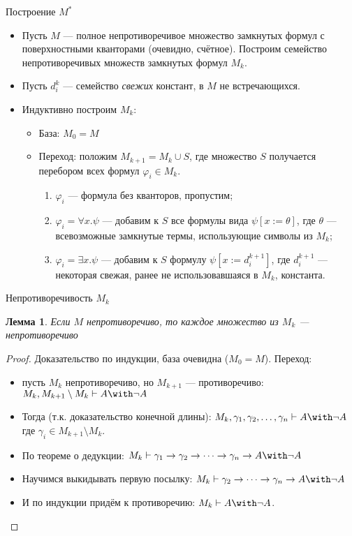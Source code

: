\documentclass[aspectratio=169]{beamer}
\newtheorem{lmm}{Лемма}[section]
\begin{document}
\begin{frame}{Построение $M^*$}
\begin{itemize}
\item Пусть $M$ --- полное непротиворечивое множество замкнутых формул с поверхностными кванторами (очевидно, счётное). \pause
 Построим семейство непротиворечивых множеств замкнутых формул $M_k$.\pause
\item Пусть $d^k_i$ --- семейство \emph{свежих} констант, в $M$ не встречающихся.\pause
\item Индуктивно построим $M_k$:
\begin{itemize}
\item База: $M_0 = M$\pause
\item Переход: положим $M_{k+1} = M_k \cup S$, где множество $S$ получается перебором всех формул $\varphi_i \in M_k$.\pause
\begin{enumerate}
\item $\varphi_i$ --- формула без кванторов, пропустим;\pause
\item $\varphi_i = \forall x.\psi$ --- добавим к $S$ все формулы вида $\psi [x := \theta]$, где
$\theta$ --- всевозможные замкнутые термы, использующие символы из $M_k$;\pause
\item $\varphi_i = \exists x.\psi$ --- добавим к $S$ формулу $\psi [x := d^{k+1}_i]$, где $d^{k+1}_i$ --- некоторая
свежая, ранее не использовавшаяся в $M_k$, константа.\pause
\end{enumerate}
\end{itemize}
\end{itemize}
\end{frame}

\begin{frame}{Непротиворечивость $M_k$}
\begin{lmm}Если $M$ непротиворечиво, то каждое множество из $M_k$ --- непротиворечиво\end{lmm}
\begin{proof}Доказательство по индукции, база очевидна ($M_0 = M$). \pause
Переход: \begin{itemize}
\item пусть $M_k$ непротиворечиво, но $M_{k+1}$ --- противоречиво: $M_k, M_{k+1}\setminus M_k \vdash A\with\neg A$ \pause
\item Тогда (т.к. доказательство конечной длины):
$M_k, \gamma_1, \gamma_2, \dots,\gamma_n\vdash A\with\neg A$
где $\gamma_i \in M_{k+1}\setminus M_k$. \pause
\item По теореме о дедукции: $M_k\vdash \gamma_1\to\gamma_2\to\dots\to\gamma_n\to A\with\neg A$ \pause
\item Научимся выкидывать первую посылку: $M_k\vdash \gamma_2\to\dots\to\gamma_n\to A\with\neg A$ \pause
\item И по индукции придём к противоречию: $M_k \vdash A\with\neg A$.
\end{itemize}

\end{proof}
\end{frame}
\end{document}
